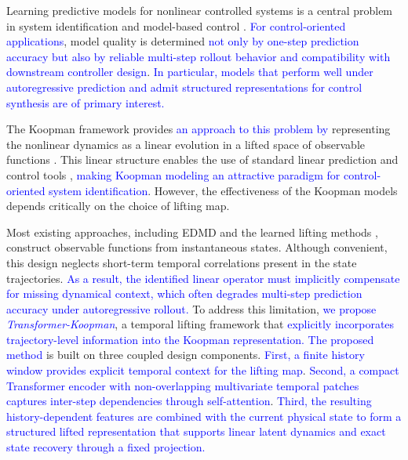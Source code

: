 \documentclass[journal]{IEEEtran}
\begin{document}
Learning predictive models for nonlinear controlled systems is a central problem in system identification and model-based control \cite{ljung1999system, vanoverschee1994n4sid, nelles2020nonlinear}. \textcolor{blue}{For control-oriented applications}, model quality is determined \textcolor{blue}{not only by one-step prediction accuracy but also by reliable multi-step rollout behavior and compatibility with downstream controller design}. \textcolor{blue}{In particular, models that perform well under autoregressive prediction and admit structured representations for control synthesis are of primary interest.}

The Koopman framework provides \textcolor{blue}{an approach to this problem by} representing the nonlinear dynamics as a linear evolution in a lifted space of observable functions \cite{koopman1931hamiltonian, brunton2022modern}. This linear structure enables the use of standard linear prediction and control tools \cite{otto2021koopman, korda2018linear}, \textcolor{blue}{making Koopman modeling an attractive paradigm for control-oriented system identification}. However, the effectiveness of the Koopman models depends critically on the choice of lifting map.

Most existing approaches, including EDMD \cite{williams2015data} and the learned lifting methods \cite{lusch2018deep, takeishi2017koopman}, construct observable functions from instantaneous states. Although convenient, this design neglects short-term temporal correlations present in the state trajectories. \textcolor{blue}{As a result, the identified linear operator must implicitly compensate for missing dynamical context, which often degrades multi-step prediction accuracy under autoregressive rollout.}
To address this limitation,\textcolor{blue}{ we propose \emph{Transformer-Koopman}}, a temporal lifting framework that \textcolor{blue}{explicitly incorporates trajectory-level information into the Koopman representation.} \textcolor{blue}{The proposed method} is built on three coupled design components. \textcolor{blue}{First, a finite history window provides explicit temporal context for the lifting map}. \textcolor{blue}{Second, a compact Transformer encoder with non-overlapping multivariate temporal patches captures inter-step dependencies through self-attention}. \textcolor{blue}{Third, the resulting history-dependent features are combined with the current physical state to form a structured lifted representation that supports linear latent dynamics and exact state recovery through a fixed projection.}
\end{document}
